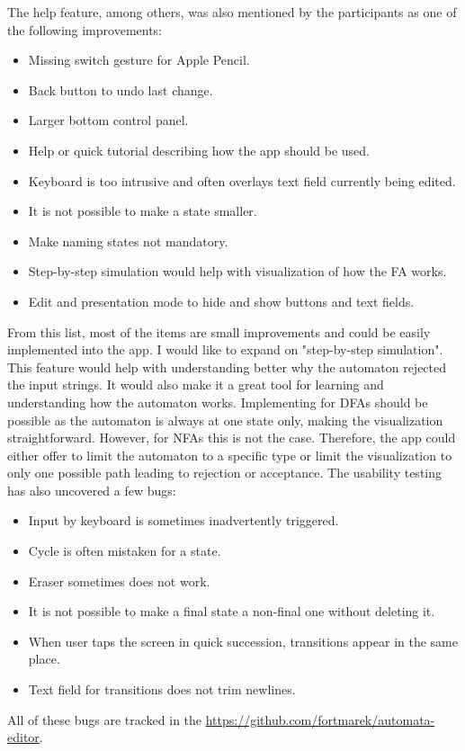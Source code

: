 The help feature, among others, was also mentioned by the participants as one of the following improvements:
\begin{itemize}
    \item Missing switch gesture for Apple Pencil.
    \item Back button to undo last change.
    \item Larger bottom control panel.
    \item Help or quick tutorial describing how the app should be used.
    \item Keyboard is too intrusive and often overlays text field currently being edited.
    \item It is not possible to make a state smaller.
    \item Make naming states not mandatory.
    \item Step-by-step simulation would help with visualization of how the FA works.
    \item Edit and presentation mode to hide and show buttons and text fields.
\end{itemize}
From this list, most of the items are small improvements and could be easily implemented into the app. I would like to expand on "step-by-step simulation". This feature would help with understanding better why the automaton rejected the input strings. It would also make it a great tool for learning and understanding how the automaton works. Implementing for DFAs should be possible as the automaton is always at one state only, making the visualization straightforward. However, for NFAs this is not the case. Therefore, the app could either offer to limit the automaton to a specific type or limit the visualization to only one possible path leading to rejection or acceptance. The usability testing has also uncovered a few bugs:
\begin{itemize}
    \item Input by keyboard is sometimes inadvertently triggered.
    \item Cycle is often mistaken for a state.
    \item Eraser sometimes does not work.
    \item It is not possible to make a final state a non-final one without deleting it.
    \item When user taps the screen in quick succession, transitions appear in the same place.
    \item Text field for transitions does not trim newlines.
\end{itemize}
All of these bugs are tracked in the \href{project's repository}{https://github.com/fortmarek/automata-editor}.

